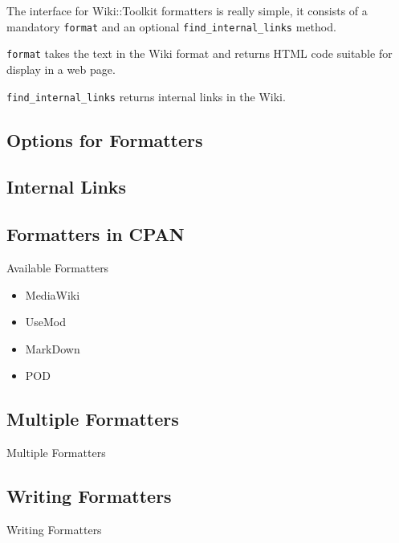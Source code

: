 The interface for Wiki::Toolkit formatters is really simple, it consists
of a mandatory \verb+format+ and an optional \verb+find_internal_links+
method.

\verb+format+ takes the text in the Wiki format and returns HTML code
suitable for display in a web page.

\verb+find_internal_links+ returns internal links in the Wiki.

\subsection{Options for Formatters}


\subsection{Internal Links}


\subsection{Formatters in CPAN}

\begin{frame}{Available Formatters}
 \begin{itemize}
  \item<1-> MediaWiki
  \item<2-> UseMod
  \item<3-> MarkDown
  \item<4-> POD
 \end{itemize}
\end{frame}

\subsection{Multiple Formatters}

\begin{frame}{Multiple Formatters}
\end{frame}

\subsection{Writing Formatters}

\begin{frame}{Writing Formatters}
\end{frame}

